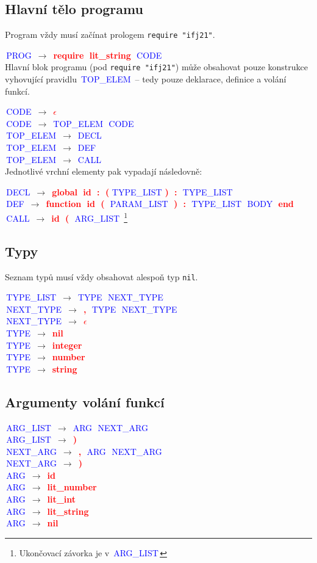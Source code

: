 \documentclass[a4paper]{article}
\theoremstyle{definition}
\newcommand{\nter}[1]{\textcolor{blue}{\,#1\,}}
\newcommand{\ter}[1]{\textbf{\textcolor{red}{\,#1\,}}}
\newcommand{\grule}[2]{{\small\nter{#1} $\to$ #2}\\}
\begin{document}
	\begin{multicols}{2}

	\subsection{Hlavní tělo programu}

	Program vždy musí začínat prologem \texttt{require "ifj21"}.

	\grule{PROG}{\ter{require} \ter{lit\_string} \nter{CODE}}

		Hlavní blok programu (pod \texttt{require "ifj21"}) může obsahovat pouze konstrukce vyhovující pravidlu \nter{TOP\_ELEM} -- tedy pouze deklarace, definice a volání funkcí.

	\grule{CODE}{\ter{$\epsilon$}}
	\grule{CODE}{\nter{TOP\_ELEM} \nter{CODE}}

	\grule{TOP\_ELEM}{\nter{DECL}}
	\grule{TOP\_ELEM}{\nter{DEF}}
	\grule{TOP\_ELEM}{\nter{CALL}}

	Jednotlivé vrchní elementy pak vypadají následovně:

	\grule{DECL}{\ter{global} \ter{id} \ter{:} \ter{(}\nter{TYPE\_LIST}\ter{)} \ter{:} \nter{TYPE\_LIST}}
	\grule{DEF}{\ter{function} \ter{id} \ter{(} \nter{PARAM\_LIST} \ter{)} \ter{:} \nter{TYPE\_LIST} \nter{BODY} \ter{end}}
	\grule{CALL}{\ter{id} \ter{(} \nter{ARG\_LIST} \footnote{Ukončovací závorka je v \nter{ARG\_LIST}}} %


	\subsection{Typy}

	Seznam typů musí vždy obsahovat alespoň typ \texttt{nil}.

	\grule{TYPE\_LIST}{\nter{TYPE} \nter{NEXT\_TYPE}}
	\grule{NEXT\_TYPE}{\ter{,} \nter{TYPE} \nter{NEXT\_TYPE}}
	\grule{NEXT\_TYPE}{\ter{$\epsilon$}}
	\grule{TYPE}{\ter{nil}}
	\grule{TYPE}{\ter{integer}}
	\grule{TYPE}{\ter{number}}
	\grule{TYPE}{\ter{string}}

	\subsection{Argumenty volání funkcí}

	\grule{ARG\_LIST}{\nter{ARG} \nter{NEXT\_ARG}}
	\grule{ARG\_LIST}{\ter{)}}
	\grule{NEXT\_ARG}{\ter{,} \nter{ARG} \nter{NEXT\_ARG}}
	\grule{NEXT\_ARG}{\ter{)}}
	\grule{ARG}{\ter{id}}
	\grule{ARG}{\ter{lit\_number}}
	\grule{ARG}{\ter{lit\_int}}
	\grule{ARG}{\ter{lit\_string}}
	\grule{ARG}{\ter{nil}}


\end{multicols}
\end{document}
